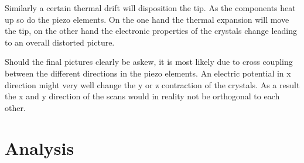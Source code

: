 \documentclass[a4paper]{scrartcl}
\numberwithin{equation}{section}
\numberwithin{figure}{section}
\numberwithin{table}{section}
\begin{document}
Similarly a certain thermal drift will disposition the tip. As the components heat up so do the piezo elements. On the one hand the thermal expansion will move the tip, on the other hand the electronic properties of the crystals change leading to an overall distorted picture.

Should the final pictures clearly be askew, it is most likely due to cross coupling between the different directions in the piezo elements. An electric potential in x direction might very well change the y or z contraction of the crystals. As a result the x and y direction of the scans would in reality not be orthogonal to each other.



\clearpage
\section{Analysis}
\end{document}
